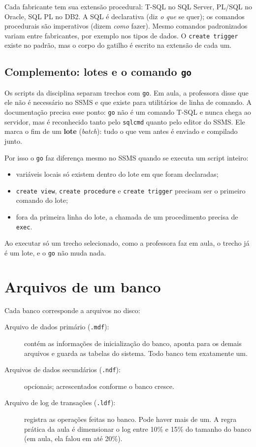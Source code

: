 Cada fabricante tem sua extensão procedural: T-SQL no SQL Server, PL/SQL
no Oracle, SQL PL no DB2. A SQL é declarativa (diz \emph{o que} se quer);
os comandos procedurais são imperativos (dizem \emph{como} fazer). Mesmo
comandos padronizados variam entre fabricantes, por exemplo nos tipos de
dados. O \texttt{create trigger} existe no padrão, mas o corpo do gatilho
é escrito na extensão de cada um.

\subsection*{Complemento: lotes e o comando \texttt{go}}

Os scripts da disciplina separam trechos com
\texttt{go}. Em aula, a professora disse que ele não é necessário no SSMS
e que existe para utilitários de linha de comando. A documentação
precisa esse ponto: \texttt{go} não é um comando T-SQL e
nunca chega ao servidor, mas é reconhecido tanto pelo \texttt{sqlcmd}
quanto pelo editor do SSMS. Ele marca o fim de um \textbf{lote}
(\emph{batch}): tudo o que vem antes é enviado e compilado junto.

Por isso o \texttt{go} faz diferença mesmo no SSMS quando se executa um
script inteiro:

\begin{itemize}
	\item variáveis locais só existem dentro do lote em que foram
	declaradas;
	\item \texttt{create view}, \texttt{create procedure} e
	\texttt{create trigger} precisam ser o primeiro comando do lote;
	\item fora da primeira linha do lote, a chamada de um procedimento
	precisa de \texttt{exec}.
\end{itemize}

Ao executar só um trecho selecionado, como a professora faz em aula, o
trecho já é um lote, e o \texttt{go} não muda nada.

\section{Arquivos de um banco}

Cada banco corresponde a arquivos no disco:

\begin{description}
	\item[Arquivo de dados primário (\texttt{.mdf}):] contém as informações
	de inicialização do banco, aponta para os demais arquivos e guarda as
	tabelas do sistema. Todo banco tem exatamente um.
	\item[Arquivos de dados secundários (\texttt{.ndf}):] opcionais;
	acrescentados conforme o banco cresce.
	\item[Arquivo de log de transações (\texttt{.ldf}):] registra as
	operações feitas no banco. Pode haver mais de um. A regra prática da
	aula é dimensionar o log entre 10\% e 15\% do tamanho do banco (em
	aula, ela falou em até 20\%).
\end{description}

